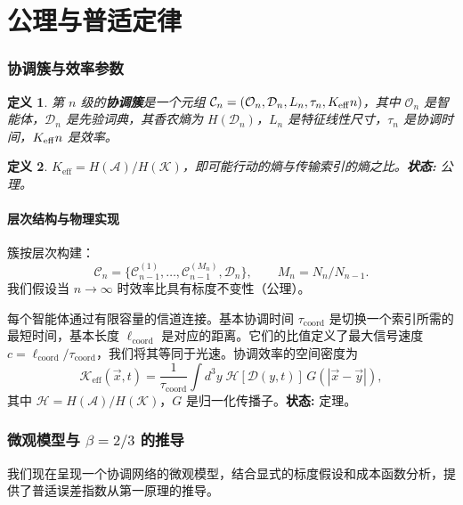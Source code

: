 \documentclass[11pt,a4paper]{article}
\newtheorem{definition}{定义}[section]
\newcommand{\Keff}[1][]{K_{\mathrm{eff}\if\relax\detokenize{#1}\relax\else,#1\fi}}
\newcommand{\coord}{\mathrm{coord}}
\newcommand{\Dir}{\mathcal{D}}
\newcommand{\cC}{\mathcal{C}}
\begin{document}
	\part{公理与普适定律}
	
	\section{协调簇与效率参数}
	\begin{definition}
		第 \(n\) 级的\textbf{协调簇}是一个元组 \(\cC_n = (\mathcal{O}_n, \Dir_n, L_n, \tau_n, \Keff{n})\)，其中 \(\mathcal{O}_n\) 是智能体，\(\Dir_n\) 是先验词典，其香农熵为 \(H(\Dir_n)\)，\(L_n\) 是特征线性尺寸，\(\tau_n\) 是协调时间，\(\Keff{n}\) 是效率。
	\end{definition}
	
	\begin{definition}
		\(K_{\mathrm{eff}} = H(\mathcal{A})/H(\mathcal{K})\)，即可能行动的熵与传输索引的熵之比。\textbf{状态:} 公理。
	\end{definition}
	
	\subsection{层次结构与物理实现}
	簇按层次构建：
	\[
	\cC_n = \{\cC_{n-1}^{(1)},\dots,\cC_{n-1}^{(M_n)},\Dir_n\}, \qquad M_n = N_n/N_{n-1}.
	\]
	我们假设当 \(n\to\infty\) 时效率比具有标度不变性（公理）。
	
	每个智能体通过有限容量的信道连接。基本协调时间 \(\tau_{\coord}\) 是切换一个索引所需的最短时间，基本长度 \(\ell_{\coord}\) 是对应的距离。它们的比值定义了最大信号速度 \(c = \ell_{\coord}/\tau_{\coord}\)，我们将其等同于光速。协调效率的空间密度为
	\begin{equation}
		\mathcal{K}_{\mathrm{eff}}(\vec{x},t) = \frac{1}{\tau_{\coord}} \int d^3y\; \mathcal{H}[\Dir(y,t)]\, G(|\vec{x}-\vec{y}|),
		\label{eq:Kfield}
	\end{equation}
	其中 \(\mathcal{H} = H(\mathcal{A})/H(\mathcal{K})\)，\(G\) 是归一化传播子。\textbf{状态:} 定理。
	
	\section{微观模型与 \(\beta = 2/3\) 的推导}
	\label{sec:micro}
	
	我们现在呈现一个协调网络的微观模型，结合显式的标度假设和成本函数分析，提供了普适误差指数从第一原理的推导。
	
\end{document}

